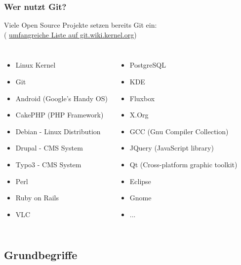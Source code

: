 \documentclass{beamer}
\begin{document}
\begin{frame}\frametitle{Wer nutzt Git?}
Viele Open Source Projekte setzen bereits Git ein: \\
( \href{https://git.wiki.kernel.org/articles/g/i/t/GitProjects_8074.html}{umfangreiche Liste auf git.wiki.kernel.org})
\begin{columns}
                \begin{itemize}                
					\item Linux Kernel
					\item Git
					\item Android (Google's Handy OS) 
					\item CakePHP (PHP Framework) 
					\item Debian - Linux Distribution
					\item Drupal - CMS System
					\item Typo3 - CMS System
					\item Perl
					\item Ruby on Rails
	                \item VLC
                \end{itemize}
                \begin{itemize}
                \item PostgreSQL
                \item KDE
                \item Fluxbox
                \item X.Org
                \item GCC (Gnu Compiler Collection)
                \item JQuery (JavaScript library) 
                \item Qt (Cross-platform graphic toolkit)
                \item Eclipse
                \item Gnome
                \item ...
                \end{itemize}
\end{columns}

\end{frame}

\subsection{Grundbegriffe}
\end{document}
